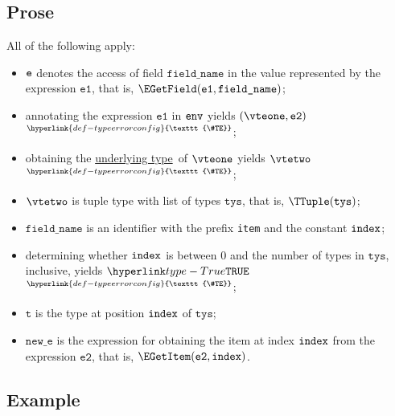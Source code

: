 \documentclass{book}
\newcommand\TypeErrorConfig[0]{\hyperlink{def-typeerrorconfig}{\texttt{\#TE}}}
\newcommand\ProseOrTypeError[0]{\hyperlink{def-proseortypeerror}{$^{\TypeErrorConfig}$}}
\newcommand\underlyingtype[0]{\hyperlink{def-underlyingtype}{underlying type}}
\newcommand\vt[0]{\texttt{t}}
\newcommand\veone[0]{\texttt{e1}}
\newcommand\vetwo[0]{\texttt{e2}}
\newcommand\fieldname[0]{\texttt{field\_name}}
\newcommand\newe[0]{\texttt{new\_e}}
\newcommand\tys[0]{\texttt{tys}}
\begin{document}
\subsection{Prose}
All of the following apply:
\begin{itemize}
  \item $\texttt{e}$ denotes the access of field $\fieldname$ in the value represented by the expression $\veone$, that is, $\EGetField(\veone, \fieldname)$;
  \item annotating the expression $\veone$ in $\texttt{env}$ yields $(\vteone, \vetwo)$ \ProseOrTypeError;
  \item obtaining the \underlyingtype\ of $\vteone$ yields $\vtetwo$ \ProseOrTypeError;
  \item $\vtetwo$ is tuple type with list of types $\tys$, that is, $\TTuple(\tys)$;
  \item $\fieldname$ is an identifier with the prefix \texttt{item} and the constant $\texttt{index}$;
  \item determining whether $\texttt{index}$ is between $0$ and the number of types in $\tys$, inclusive, yields $\True$ \ProseOrTypeError;
  \item $\vt$ is the type at position $\texttt{index}$ of $\tys$;
  \item $\newe$ is the expression for obtaining the item at index $\texttt{index}$ from the expression $\vetwo$, that is, $\EGetItem(\vetwo, \vindex)$.
\end{itemize}

\subsection{Example}

\end{document}
